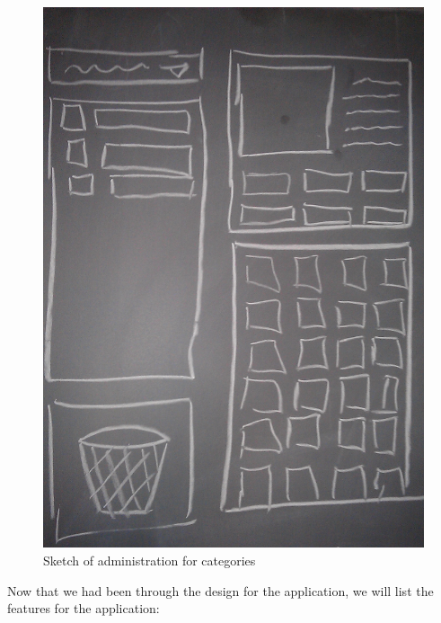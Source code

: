 \begin{figure}[htbp]
	\centering
		\includegraphics[scale=0.10]{input/images/admincate.jpg}
	\caption{Sketch of administration for categories}
	\label{fig:admincate}
\end{figure}

Now that we had been through the design for the application, we will list the features for the application: 

